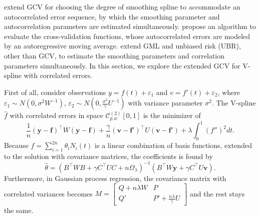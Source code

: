 \cite{diggle1989spline} extend GCV for choosing the degree of smoothing spline to accommodate an autocorrelated error sequence, by which the smoothing parameter and autocorrelation parameters are estimated simultaneously.  \cite{kohn1992nonparametric} propose an algorithm to evaluate the cross-validation functions, whose autocorrelated errors are modeled by an autoregressive moving average. \cite{wang1998smoothing} extend GML and unbiased risk (UBR), other than GCV, to estimate the smoothing parameters and correlation parameters simultaneously. In this section, we explore the extended GCV for V-spline with correlated errors. 


First of all, consider observations $y=f(t)+\varepsilon_1$ and $v=f'(t)+\varepsilon_2$, where $\varepsilon_1\sim N\left(0,\sigma^2W^{-1}\right)$, $\varepsilon_2\sim N\left(0,\frac{\sigma^2}{\gamma}U^{-1}\right)$ with variance parameter $\sigma^2$. The V-spline $\hat{f}$ with correlated errors in space $\mathcal{C}_{p.w}^{(2)}[0,1]$ is the minimizer of 
\begin{equation}
\frac{1}{n}\left(\mathbf{y}-\mathbf{f}\right)^\top W\left(\mathbf{y}-\mathbf{f}\right)+\frac{\gamma}{n}\left(\mathbf{v}-\mathbf{f}'\right)^\top U\left(\mathbf{v}-\mathbf{f}'\right)+\lambda\int_0^1\left(f''\right)^2dt.
\end{equation}
Because $f=\sum_{i=1}^{2n}\theta_iN_i\left(t\right)$ is a linear combination of basis functions, extended to the solution with covariance matrices, the coefficients is found by 
\begin{equation}
\hat{\theta}=\left(B^\top W B+ \gamma C^\top UC+n\Omega_\lambda\right)^{-1}\left(B^\top W \mathbf{y}+\gamma C^\top U\mathbf{v}\right).
\end{equation}
Furthermore, in Gaussian process regression, the covariance matrix with correlated variances becomes 
$M=\begin{bmatrix}
Q+n\lambda W& P\\
Q'& P'+\frac{n\lambda}{\gamma}U
\end{bmatrix}$ and the rest stays the same. 


